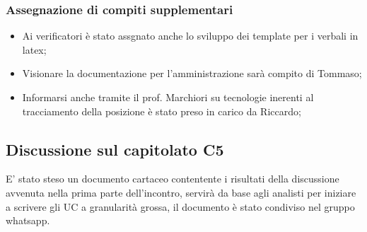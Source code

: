 \subsubsection{Assegnazione di compiti supplementari}
\begin{itemize}
\item Ai verificatori è stato assgnato anche lo sviluppo dei template per i verbali in latex;
\item Visionare la documentazione per l'amministrazione sarà compito di Tommaso;
\item Informarsi anche tramite il prof. Marchiori su tecnologie inerenti al tracciamento della posizione è stato preso in carico da Riccardo;
\end{itemize}
\subsection{Discussione sul capitolato C5}
E' stato steso un documento cartaceo contentente i risultati della discussione avvenuta nella prima parte dell'incontro, servirà da base agli analisti per iniziare a 
scrivere gli UC a granularità grossa, il documento è stato condiviso nel gruppo whatsapp.
\clearpage